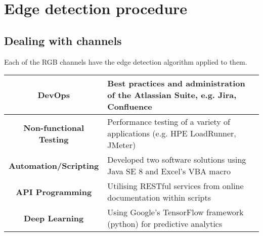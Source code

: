 \documentclass[11pt]{article}
\begin{document}
\section{Edge detection procedure}
\subsection{Dealing with channels}
Each of the RGB channels have the edge detection algorithm applied to them.\\



\begin{table}[h]
\begin{center}
\begin{tabular}{|c|l|}
\hline
{\bf DevOps} & Best practices and administration of the Atlassian Suite, e.g. Jira, Confluence\\
\hline
{\bf Non-functional Testing} & Performance testing of a variety of applications (e.g. HPE LoadRunner, JMeter)\\
\hline
{\bf Automation/Scripting} & Developed two software solutions using Java SE 8 and Excel's VBA macro\\
\hline
{\bf API Programming} & Utilising RESTful services from online documentation within scripts\\
\hline
{\bf Deep Learning} & Using Google's TensorFlow framework (python) for predictive analytics\\
\hline
\end{tabular}
\end{center}
\label{default}
\end{table}
\end{document}
